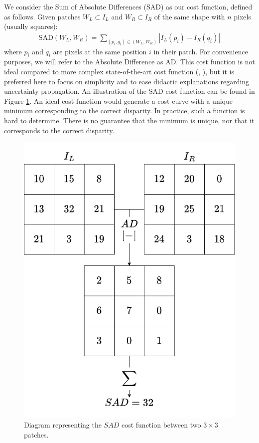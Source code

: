 We consider the Sum of Absolute Differences (SAD) as our cost function, defined as follows. Given patches $W_L\subset I_L$ and $W_R\subset I_R$ of the same shape with $n$ pixels (usually squares):
\begin{align}
    \mathrm{SAD}(W_L, W_R) = \sum_{(p_i, q_i)\in (W_L, W_R)}|I_L(p_i) - I_R(q_i)|\label{eq:SAD}
\end{align}
where $p_i$ and $q_i$ are pixels at the same position $i$ in their patch. For convenience purposes, we will refer to the Absolute Difference as AD. This cost function is not ideal compared to more complex state-of-the-art cost function (\cite{zbontar_stereo_2016}, \cite{laga_survey_2022}), but it is preferred here to focus on simplicity and to ease didactic explanations regarding uncertainty propagation. An illustration of the SAD cost function can be found in Figure \ref{fig:SAD}. An ideal cost function would generate a cost curve with a unique minimum corresponding to the correct disparity. In practice, such a function is hard to determine. There is no guarantee that the minimum is unique, nor that it corresponds to the correct disparity. 

\begin{figure}
    \centering
    \includegraphics[width=0.5\linewidth]{Images/SAD.png}
    \caption{Diagram representing the $SAD$ cost function between two $3\times3$ patches.}
    \label{fig:SAD}
\end{figure}

